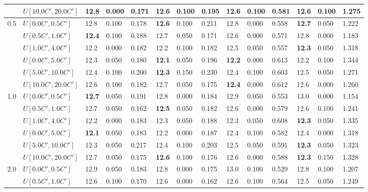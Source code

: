 \begin{table}[h]
{\begin{tabular}{|l|l||l|l|l||l|l|l||l|l|l||l|l|l|}
       & $U[10.0C',20.0C']$ & 12.8 & 0.000 & 0.171 & \textbf{12.6} & 0.100 & 0.195 & 12.6 & 0.100 & 0.581 & 12.6 & 0.100 & 1.275 \\
      \hline\hline
      \multirow{6}{*}{0.5} & $U[0.0C',0.5C']$ & 12.8 & 0.100 & 0.178 & \textbf{12.6} & 0.100 & 0.211 & 12.8 & 0.000 & 0.558 & \textbf{12.7} & 0.050 & 1.222 \\
       & $U[0.5C',1.0C']$ & \textbf{12.4} & 0.100 & 0.188 & 12.7 & 0.050 & 0.171 & 12.6 & 0.000 & 0.571 & 12.8 & 0.000 & 1.183 \\
       & $U[1.0C',4.0C']$ & 12.2 & 0.000 & 0.182 & 12.2 & 0.100 & 0.182 & 12.5 & 0.050 & 0.557 & \textbf{12.3} & 0.050 & 1.318 \\
       & $U[0.0C',5.0C']$ & 12.3 & 0.050 & 0.180 & \textbf{12.1} & 0.050 & 0.196 & \textbf{12.2} & 0.000 & 0.613 & 12.2 & 0.100 & 1.344 \\
       & $U[5.0C',10.0C']$ & 12.4 & 0.100 & 0.200 & \textbf{12.3} & 0.150 & 0.230 & 12.4 & 0.100 & 0.603 & 12.5 & 0.050 & 1.271 \\
       & $U[10.0C',20.0C']$ & 12.6 & 0.100 & 0.182 & 12.7 & 0.050 & 0.175 & \textbf{12.4} & 0.000 & 0.612 & 12.6 & 0.000 & 1.260 \\
      \hline\hline
      \multirow{6}{*}{1.0} & $U[0.0C',0.5C']$ & \textbf{12.7} & 0.050 & 0.191 & 12.8 & 0.000 & 0.184 & 12.9 & 0.050 & 0.553 & 13.0 & 0.000 & 1.154 \\
       & $U[0.5C',1.0C']$ & 12.7 & 0.050 & 0.162 & \textbf{12.5} & 0.050 & 0.182 & 12.6 & 0.000 & 0.579 & 12.6 & 0.100 & 1.241 \\
       & $U[1.0C',4.0C']$ & 12.2 & 0.000 & 0.183 & 12.3 & 0.050 & 0.188 & 12.3 & 0.050 & 0.608 & \textbf{12.3} & 0.050 & 1.335 \\
       & $U[0.0C',5.0C']$ & \textbf{12.1} & 0.050 & 0.183 & 12.2 & 0.000 & 0.187 & 12.4 & 0.100 & 0.582 & 12.4 & 0.000 & 1.318 \\
       & $U[5.0C',10.0C']$ & 12.3 & 0.050 & 0.217 & 12.4 & 0.100 & 0.203 & 12.5 & 0.050 & 0.591 & \textbf{12.3} & 0.050 & 1.323 \\
       & $U[10.0C',20.0C']$ & 12.7 & 0.050 & 0.175 & \textbf{12.6} & 0.100 & 0.176 & 12.6 & 0.000 & 0.588 & \textbf{12.3} & 0.150 & 1.328 \\
      \hline\hline
      \multirow{6}{*}{2.0} & $U[0.0C',0.5C']$ & 12.9 & 0.050 & 0.183 & 12.8 & 0.000 & 0.175 & 13.0 & 0.100 & 0.529 & 12.8 & 0.100 & 1.207 \\
       & $U[0.5C',1.0C']$ & 12.6 & 0.100 & 0.170 & 12.6 & 0.000 & 0.162 & 12.6 & 0.100 & 0.564 & 12.5 & 0.050 & 1.249 \\

\end{tabular}}
\end{table}

